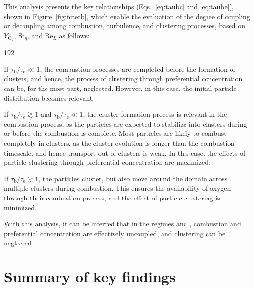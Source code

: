 \documentclass[authoryear,preprint,review,12pt]{elsarticle}
\newcommand{\mrm}[1]{\mathrm{#1}}
\newcommand{\taub}{\tau_\mathrm{b}}
\newcommand{\tauc}{\tau_\mathrm{c}}
\newcommand{\taue}{\tau_\mathrm{e}}
\newcommand{\pink}{}
\begin{document}
{\pink This analysis presents the key relationships (Eqs.~\ref{eq:taubc} and \ref{eq:taube}), shown in Figure~\ref{fig:tctetb}, which enable the evaluation of the degree of coupling or decoupling among combustion, turbulence, and clustering processes, based on $Y_\mrm{O_2}$, $\mrm{St}_\eta$, and $\mrm{Re}_L$ as follows:
\begin{dingautolist}{192}
\setlength\itemsep{0em}
    \item If $\taub/\tauc \ll 1$, the combustion processes are completed before the formation of clusters, and hence, the process of clustering through preferential concentration can be, for the most part, neglected. However, in this case, the initial particle distribution becomes relevant. 
    \item If $\taub/\tauc \gtrsim 1$ and $\taub/\taue \ll 1$, the cluster formation process is relevant in the combustion process, as the particles are expected to stabilize into clusters during or before the combustion is complete. Most particles are likely to combust completely in clusters, as the cluster evolution is longer than the combustion timescale, and hence transport out of clusters is weak. In this case, the effects of particle clustering through preferential concentration are maximized.
    \item If $\taub/\taue \gtrsim 1$, the particles cluster, but also move around the domain across multiple clusters during combustion. This ensures the availability of oxygen through their combustion process, and the effect of particle clustering is minimized.
\end{dingautolist}

With this analysis, it can be inferred that in the regimes  and , combustion and preferential concentration are effectively uncoupled, and clustering can be neglected. 

\section{Summary of key findings}\label{sec:conclusion}

}
\end{document}

